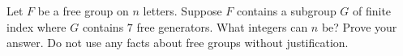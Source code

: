 Let $F$ be a free group on $n$ letters. Suppose $F$ contains a
subgroup $G$ of finite index where $G$ contains $7$ free generators.
What integers can $n$ be? Prove your answer. Do not use any facts
about free groups without justification.
